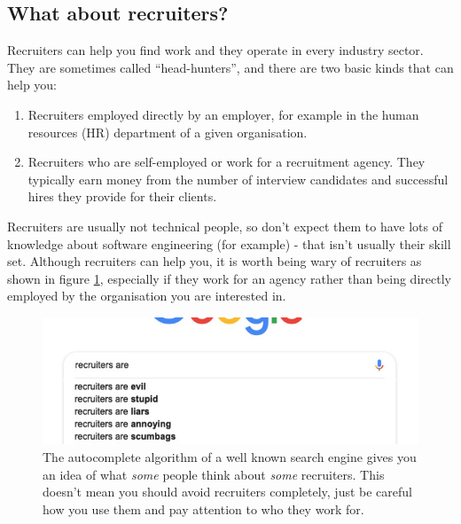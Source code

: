 \documentclass[
]{book}
\providecommand{\tightlist}{%
  \setlength{\itemsep}{0pt}\setlength{\parskip}{0pt}}
\begin{document}
\hypertarget{recruiters}{%
\subsection{What about recruiters?}\label{recruiters}}

Recruiters can help you find work and they operate in every industry sector. They are sometimes called ``head-hunters'', and there are two basic kinds that can help you:

\begin{enumerate}
\def\labelenumi{\arabic{enumi}.}
\tightlist
\item
  Recruiters employed directly by an employer, for example in the human resources (HR) department of a given organisation.
\item
  Recruiters who are self-employed or work for a recruitment agency. They typically earn money from the number of interview candidates and successful hires they provide for their clients.
\end{enumerate}

Recruiters are usually not technical people, so don't expect them to have lots of knowledge about software engineering (for example) - that isn't usually their skill set. Although recruiters can help you, it is worth being wary of recruiters as shown in figure \ref{fig:recruiter-fig}, especially if they work for an agency rather than being directly employed by the organisation you are interested in.

\begin{figure}

{\centering \includegraphics[width=0.9\linewidth]{images/recruiters-are} 

}

\caption{The autocomplete algorithm of a well known search engine gives you an idea of what \emph{some} people think about \emph{some} recruiters. This doesn't mean you should avoid recruiters completely, just be careful how you use them and pay attention to who they work for.}\label{fig:recruiter-fig}
\end{figure}
\end{document}

